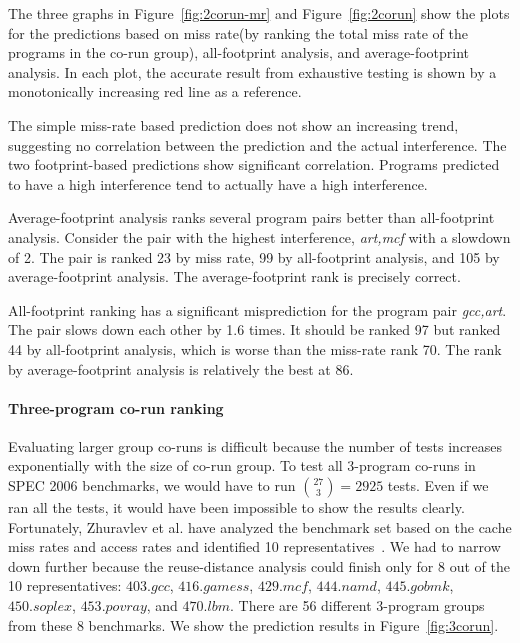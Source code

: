 The three graphs in Figure~\ref{fig:2corun-mr} and
Figure~\ref{fig:2corun} show the plots for the predictions based on
miss rate(by ranking the total miss rate of the programs in the
co-run group), all-footprint analysis, and average-footprint
analysis. In each plot, the accurate result from exhaustive testing is
shown by a monotonically increasing red line as a reference.

The simple miss-rate based prediction does not show an increasing trend,
suggesting no correlation between the prediction and the actual
interference.  The two footprint-based predictions show significant
correlation.  Programs predicted to have a high interference tend to
actually have a high interference.  

Average-footprint analysis ranks several program pairs better than
all-footprint analysis. Consider the pair with the highest
interference, \emph{art,mcf} with a slowdown of 2.  The pair is ranked
23 by miss rate, 99 by all-footprint analysis, and 105 by
average-footprint analysis.  The average-footprint rank is precisely
correct.

All-footprint ranking has a significant misprediction for the program
pair \emph{gcc,art}.  The pair slows down each other by 1.6 times.  It
should be ranked 97 but ranked 44 by all-footprint analysis, which is
worse than the miss-rate rank 70.  The rank by average-footprint
analysis is relatively the best at 86. 

\paragraph{Three-program co-run ranking}

Evaluating larger group co-runs is difficult because the number of
tests increases exponentially with the size of co-run group.  To test all
3-program co-runs in SPEC 2006 benchmarks, we would have to run
${27\choose3} = 2925$ tests.  Even if we ran all the tests, it would
have been impossible to show the results clearly.  Fortunately,
Zhuravlev et al. have analyzed the benchmark set based on the cache
miss rates and access rates and identified 10
representatives~\cite{Zhuravlev+:ASPLOS10}.  We had to narrow
down further because the reuse-distance analysis could finish only for
8 out of the 10 representatives:  $403.gcc$, $416.gamess$, $429.mcf$,
$444.namd$, $445.gobmk$, $450.soplex$, $453.povray$, and
$470.lbm$. There are 56 different 3-program groups from these 8
benchmarks. We show the prediction results in Figure~\ref{fig:3corun}. 

